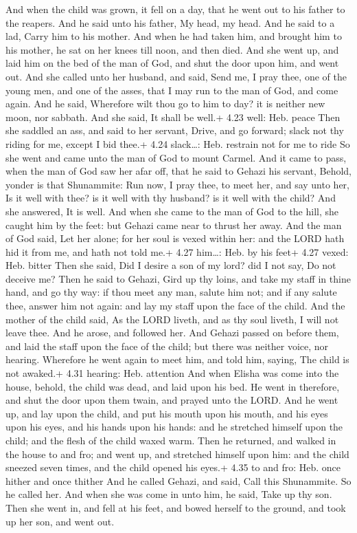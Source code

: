  And when the child was grown, it fell on a day, that he
went out to his father to the reapers.  And he said unto
his father, My head, my head. And he said to a lad, Carry him to his
mother.  And when he had taken him, and brought him to his
mother, he sat on her knees till noon, and then died.  And
she went up, and laid him on the bed of the man of God, and shut the
door upon him, and went out.  And she called unto her
husband, and said, Send me, I pray thee, one of the young men, and one
of the asses, that I may run to the man of God, and come again.
 And he said, Wherefore wilt thou go to him to day? it is
neither new moon, nor sabbath. And she said, It shall be well.+ 4.23
well: Heb. peace  Then she saddled an ass, and said to her
servant, Drive, and go forward; slack not thy riding for me, except I
bid thee.+ 4.24 slack\ldots: Heb. restrain not for me to ride
 So she went and came unto the man of God to mount Carmel.
And it came to pass, when the man of God saw her afar off, that he said
to Gehazi his servant, Behold, yonder is that Shunammite: 
Run now, I pray thee, to meet her, and say unto her, Is it well with
thee? is it well with thy husband? is it well with the child? And she
answered, It is well.  And when she came to the man of God
to the hill, she caught him by the feet: but Gehazi came near to thrust
her away. And the man of God said, Let her alone; for her soul is vexed
within her: and the LORD hath hid it from me, and hath not told me.+
4.27 him\ldots: Heb. by his feet+ 4.27 vexed: Heb. bitter 
Then she said, Did I desire a son of my lord? did I not say, Do not
deceive me?  Then he said to Gehazi, Gird up thy loins, and
take my staff in thine hand, and go thy way: if thou meet any man,
salute him not; and if any salute thee, answer him not again: and lay my
staff upon the face of the child.  And the mother of the
child said, As the LORD liveth, and as thy soul liveth, I will not leave
thee. And he arose, and followed her.  And Gehazi passed on
before them, and laid the staff upon the face of the child; but there
was neither voice, nor hearing. Wherefore he went again to meet him, and
told him, saying, The child is not awaked.+ 4.31 hearing: Heb. attention
 And when Elisha was come into the house, behold, the child
was dead, and laid upon his bed.  He went in therefore, and
shut the door upon them twain, and prayed unto the LORD. 
And he went up, and lay upon the child, and put his mouth upon his
mouth, and his eyes upon his eyes, and his hands upon his hands: and he
stretched himself upon the child; and the flesh of the child waxed warm.
 Then he returned, and walked in the house to and fro; and
went up, and stretched himself upon him: and the child sneezed seven
times, and the child opened his eyes.+ 4.35 to and fro: Heb. once hither
and once thither  And he called Gehazi, and said, Call this
Shunammite. So he called her. And when she was come in unto him, he
said, Take up thy son.  Then she went in, and fell at his
feet, and bowed herself to the ground, and took up her son, and went
out.

